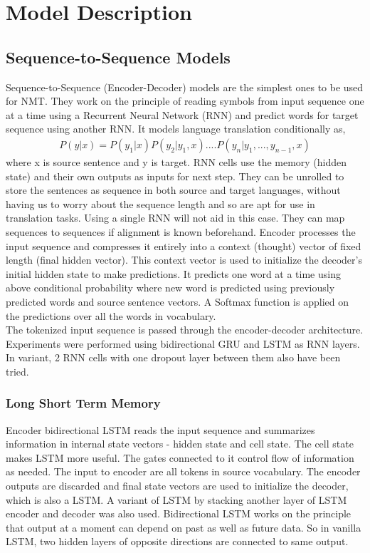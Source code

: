 \documentclass[11pt, oneside]{article}   	%
\begin{document}
\section{Model Description}
\subsection{Sequence-to-Sequence Models\cite{sutskever2014sequence}}

Sequence-to-Sequence (Encoder-Decoder) models are the simplest ones to be used for NMT. They work on the principle of reading symbols from input sequence one at a time using a Recurrent Neural Network (RNN) and predict words for target sequence using another RNN. It models language translation conditionally as,
\begin{align*}
P(y|x) = P(y_1|x) P(y_2 | y_1,x) .... P(y_n | y_1, ..., y_{n-1}, x)
\end{align*}
where x is source sentence and y is target.
RNN cells use the memory (hidden state) and their own outputs as inputs for next step. They can be unrolled to store the sentences as sequence in both source and target languages, without having us to worry about the sequence length and so are apt for use in translation tasks. Using a single RNN will not aid in this case. They can map sequences to sequences if alignment is known beforehand. Encoder processes the input sequence and compresses it entirely into a context (thought) vector of fixed length (final hidden vector). This context vector is used to initialize the decoder's initial hidden state to make predictions. It predicts one word at a time using above conditional probability where new word is predicted using previously predicted words and source sentence vectors. A Softmax function is applied on the predictions over all the words in vocabulary.  \\
The tokenized input sequence is passed through the encoder-decoder architecture. Experiments were performed using bidirectional GRU and LSTM as RNN layers. In variant, 2 RNN cells with one dropout layer between them also have been tried.

\subsubsection{Long Short Term Memory}
Encoder bidirectional LSTM reads the input sequence and summarizes information in internal state vectors - hidden state and cell state. The cell state makes LSTM more useful. The gates connected to it control flow of information as needed. The input to encoder are all tokens in source vocabulary. The encoder outputs are discarded and final state vectors are used to initialize the decoder, which is also a LSTM. A variant of LSTM by stacking another layer of LSTM encoder and decoder was also used. Bidirectional LSTM works on the principle that output at a moment can depend on past as well as future data. So in vanilla LSTM, two hidden layers of opposite directions are connected to same output.
\end{document}
